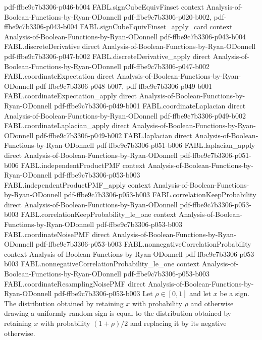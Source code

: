 \begin{theorem}
  {pdf-ffbe9c7b3306-p046-b004}
\proofstep
  {FABL.signCubeEquivFinset}
  {context}
  {Analysis-of-Boolean-Functions-by-Ryan-ODonnell}
  {pdf-ffbe9c7b3306-p020-b002,
    pdf-ffbe9c7b3306-p043-b004}
\proofstep
  {FABL.signCubeEquivFinset_apply_card}
  {context}
  {Analysis-of-Boolean-Functions-by-Ryan-ODonnell}
  {pdf-ffbe9c7b3306-p043-b004}
\proofstep
  {FABL.discreteDerivative}
  {direct}
  {Analysis-of-Boolean-Functions-by-Ryan-ODonnell}
  {pdf-ffbe9c7b3306-p047-b002}
\proofstep
  {FABL.discreteDerivative_apply}
  {direct}
  {Analysis-of-Boolean-Functions-by-Ryan-ODonnell}
  {pdf-ffbe9c7b3306-p047-b002}
\proofstep
  {FABL.coordinateExpectation}
  {direct}
  {Analysis-of-Boolean-Functions-by-Ryan-ODonnell}
  {pdf-ffbe9c7b3306-p048-b007,
    pdf-ffbe9c7b3306-p049-b001}
\proofstep
  {FABL.coordinateExpectation_apply}
  {direct}
  {Analysis-of-Boolean-Functions-by-Ryan-ODonnell}
  {pdf-ffbe9c7b3306-p049-b001}
\proofstep
  {FABL.coordinateLaplacian}
  {direct}
  {Analysis-of-Boolean-Functions-by-Ryan-ODonnell}
  {pdf-ffbe9c7b3306-p049-b002}
\proofstep
  {FABL.coordinateLaplacian_apply}
  {direct}
  {Analysis-of-Boolean-Functions-by-Ryan-ODonnell}
  {pdf-ffbe9c7b3306-p049-b002}
\proofstep
  {FABL.laplacian}
  {direct}
  {Analysis-of-Boolean-Functions-by-Ryan-ODonnell}
  {pdf-ffbe9c7b3306-p051-b006}
\proofstep
  {FABL.laplacian_apply}
  {direct}
  {Analysis-of-Boolean-Functions-by-Ryan-ODonnell}
  {pdf-ffbe9c7b3306-p051-b006}
\proofstep
  {FABL.independentProductPMF}
  {context}
  {Analysis-of-Boolean-Functions-by-Ryan-ODonnell}
  {pdf-ffbe9c7b3306-p053-b003}
\proofstep
  {FABL.independentProductPMF_apply}
  {context}
  {Analysis-of-Boolean-Functions-by-Ryan-ODonnell}
  {pdf-ffbe9c7b3306-p053-b003}
\proofstep
  {FABL.correlationKeepProbability}
  {direct}
  {Analysis-of-Boolean-Functions-by-Ryan-ODonnell}
  {pdf-ffbe9c7b3306-p053-b003}
\proofstep
  {FABL.correlationKeepProbability_le_one}
  {context}
  {Analysis-of-Boolean-Functions-by-Ryan-ODonnell}
  {pdf-ffbe9c7b3306-p053-b003}
\proofstep
  {FABL.coordinateNoisePMF}
  {direct}
  {Analysis-of-Boolean-Functions-by-Ryan-ODonnell}
  {pdf-ffbe9c7b3306-p053-b003}
\proofstep
  {FABL.nonnegativeCorrelationProbability}
  {context}
  {Analysis-of-Boolean-Functions-by-Ryan-ODonnell}
  {pdf-ffbe9c7b3306-p053-b003}
\proofstep
  {FABL.nonnegativeCorrelationProbability_le_one}
  {context}
  {Analysis-of-Boolean-Functions-by-Ryan-ODonnell}
  {pdf-ffbe9c7b3306-p053-b003}
\proofstep
  {FABL.coordinateResamplingNoisePMF}
  {direct}
  {Analysis-of-Boolean-Functions-by-Ryan-ODonnell}
  {pdf-ffbe9c7b3306-p053-b003}
Let $\rho\in[0,1]$ and let $x$ be a sign. The distribution obtained by retaining $x$
with probability $\rho$ and otherwise drawing a uniformly random sign is equal to the
distribution obtained by retaining $x$ with probability $(1+\rho)/2$ and replacing it by
its negative otherwise.
\end{theorem}

